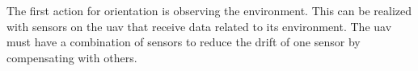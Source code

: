 The first action for orientation is observing the environment. This can be realized with sensors on the \acs{uav} that receive data related to its environment. The \acs{uav} must have a combination of sensors to reduce the drift of one sensor by compensating with others.